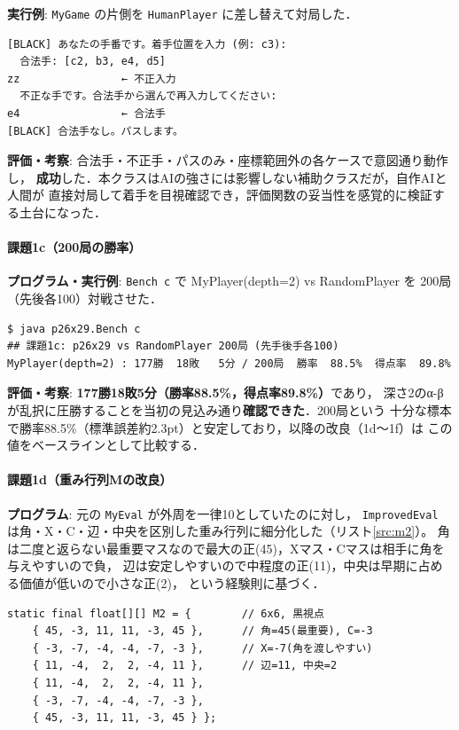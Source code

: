 \documentclass[11pt,a4j]{ujarticle} %
\begin{document}
\textbf{実行例}: {\verb+MyGame+} の片側を {\verb+HumanPlayer+} に差し替えて対局した．
\begin{lstlisting}[caption=HumanPlayerの実行例,label=ex:1b]
[BLACK] あなたの手番です。着手位置を入力 (例: c3):
  合法手: [c2, b3, e4, d5]
zz                ← 不正入力
  不正な手です。合法手から選んで再入力してください:
e4                ← 合法手
[BLACK] 合法手なし。パスします。
\end{lstlisting}

\textbf{評価・考察}: 合法手・不正手・パスのみ・座標範囲外の各ケースで意図通り動作し，
\textbf{成功}した．本クラスはAIの強さには影響しない補助クラスだが，自作AIと人間が
直接対局して着手を目視確認でき，評価関数の妥当性を感覚的に検証する土台になった．

\paragraph{課題1c（200局の勝率）}
\textbf{プログラム・実行例}: {\verb+Bench c+} で MyPlayer(depth=2) vs RandomPlayer を
200局（先後各100）対戦させた．
\begin{lstlisting}[caption=課題1cの実行例,label=ex:1c]
$ java p26x29.Bench c
## 課題1c: p26x29 vs RandomPlayer 200局 (先手後手各100)
MyPlayer(depth=2) : 177勝  18敗   5分 / 200局  勝率  88.5%  得点率  89.8%
\end{lstlisting}

\textbf{評価・考察}: \textbf{177勝18敗5分（勝率88.5\%，得点率89.8\%）}であり，
深さ2のα-βが乱択に圧勝することを当初の見込み通り\textbf{確認できた}．200局という
十分な標本で勝率88.5\%（標準誤差約2.3pt）と安定しており，以降の改良（1d〜1f）は
この値をベースラインとして比較する．

\paragraph{課題1d（重み行列Mの改良）}
\textbf{プログラム}: 元の {\verb+MyEval+} が外周を一律10としていたのに対し，
{\verb+ImprovedEval+} は角・X・C・辺・中央を区別した重み行列に細分化した（リスト\ref{src:m2}）。
角は二度と返らない最重要マスなので最大の正(45)，Xマス・Cマスは相手に角を与えやすいので負，
辺は安定しやすいので中程度の正(11)，中央は早期に占める価値が低いので小さな正(2)，
という経験則に基づく．
\begin{lstlisting}[caption=細分化した重み行列（ImprovedEval）,label=src:m2]
static final float[][] M2 = {        // 6x6, 黒視点
    { 45, -3, 11, 11, -3, 45 },      // 角=45(最重要), C=-3
    { -3, -7, -4, -4, -7, -3 },      // X=-7(角を渡しやすい)
    { 11, -4,  2,  2, -4, 11 },      // 辺=11, 中央=2
    { 11, -4,  2,  2, -4, 11 },
    { -3, -7, -4, -4, -7, -3 },
    { 45, -3, 11, 11, -3, 45 } };
\end{lstlisting}
\end{document}
